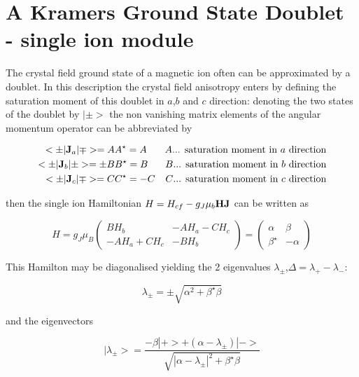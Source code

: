 \newpage
\section{A Kramers Ground State Doublet - single ion module}\label{kramers}

The crystal field ground state of a magnetic ion often can be
approximated by a doublet. In this description the crystal field
anisotropy enters by defining the saturation moment of this doublet
in $a$,$b$ and $c$ direction: denoting the two states of the doublet
by $|\pm>$ the non vanishing matrix elements of the angular momentum
operator can be abbreviated by 

\begin{eqnarray}
<\pm|{\mathbf J}_a|\mp>=A & A^{\star}=A & A\mbox{... saturation moment in $a$ direction}\nonumber\\
<\pm|{\mathbf J}_b|\pm>=\pm B & B^{\star}=B & B\mbox{... saturation moment in $b$ direction}\\
<\pm|{\mathbf J}_c|\mp>=C & C^{\star}=-C & C\mbox{... saturation moment in $c$ direction}\nonumber\\
\end{eqnarray}


then the single ion Hamiltonian $H=H_{cf}- g_J \mu_b {\mathbf H}{\mathbf J}$
can be written as

\begin{equation}\label{hamkramer}
H=g_J \mu_B 
\left (
\begin{array}{cc}
B H_b & -A H_a- C H_c\\
-A H_a +C H_c &  -B H_b
\end{array}
\right)=
\left (
\begin{array}{cc}
\alpha & \beta\\
\beta^{\star} & -\alpha
\end{array}
\right)
\end{equation}

This Hamilton may be diagonalised yielding the 2 eigenvalues
$\lambda_{\pm}$,$\Delta=\lambda_+ - \lambda_-$:

\begin{equation}
\lambda_{\pm}=\pm \sqrt{\alpha^2+\beta^{\star}\beta}
\end{equation}

and the eigenvectors

\begin{equation}
|\lambda_{\pm}>=\frac{-\beta|+>+(\alpha-\lambda_{\pm})|->}
{\sqrt{|\alpha-\lambda_{\pm}|^2+\beta^{\star}\beta}}
\end{equation}

